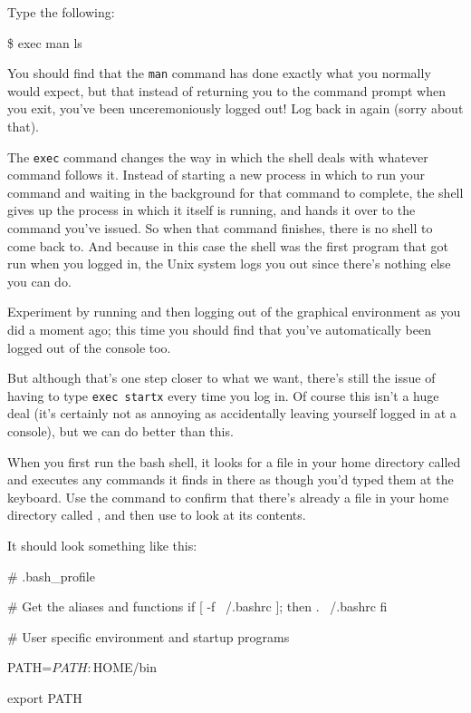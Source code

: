Type the following:

\begin{ttoutenv}
\$ exec man ls
\end{ttoutenv}

You should find that the \texttt{man} command has done exactly what you normally would expect, but that instead of returning you to the command prompt when you exit, you've been unceremoniously logged out! Log back in again (sorry about that). 

The \texttt{exec} command changes the way in which the shell deals with whatever command follows it. Instead of starting a new process in which to run your command and waiting in the background for that command to complete, the shell gives up the process in which it itself is running, and hands it over to the command you've issued. So when that command finishes, there is no shell to come back to. And because in this case the shell was the first program that got run when you logged in, the Unix system logs you out since there's nothing else you can do. 

Experiment by running  and then logging out of the graphical environment as you did a moment ago; this time you should find that you've automatically been logged out of the console too.

But although that's one step closer to what we want, there's still the issue of having to type \texttt{exec startx} every time you log in. Of course this isn't a huge deal (it's certainly not as annoying as accidentally leaving yourself logged in at a console), but we can do better than this. 

When you first run the bash shell, it looks for a file in your home directory called  and executes any commands it finds in there as though you'd typed them at the keyboard. Use the  command to confirm that there's already a file in your home directory called , and then use  to look at its contents.

It should look something like this:

\begin{ttoutenv}
# .bash_profile

# Get the aliases and functions
if [ -f ~/.bashrc ]; then
	. ~/.bashrc
fi

# User specific environment and startup programs

PATH=$PATH:$HOME/bin

export PATH
\end{ttoutenv}

